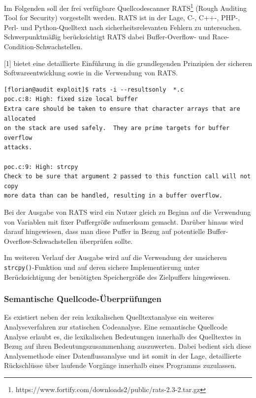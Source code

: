 Im Folgenden soll der frei verfügbare Quellcodescanner RATS\footnote{https://www.fortify.com/downloads2/public/rats-2.3-2.tar.gz} (Rough Auditing Tool for Security) vorgestellt werden. RATS ist in der Lage, C-, C++-, PHP-, Perl- und Python-Quelltext nach sicherheitsrelevanten Fehlern zu untersuchen. Schwerpunktmäßig berücksichtigt RATS dabei Buffer-Overflow- und Race-Condition-Schwachstellen.

[1] bietet eine detaillierte Einführung in die grundlegenden Prinzipien der sicheren Softwareentwicklung sowie in die Verwendung von RATS.

\begin{lstlisting}[basicstyle=\ttfamily\footnotesize]
[florian@audit exploit]$ rats -i --resultsonly  *.c
poc.c:8: High: fixed size local buffer
Extra care should be taken to ensure that character arrays that are allocated
on the stack are used safely.  They are prime targets for buffer overflow
attacks.

poc.c:9: High: strcpy
Check to be sure that argument 2 passed to this function call will not copy
more data than can be handled, resulting in a buffer overflow.
\end{lstlisting}

Bei der Ausgabe von RATS wird ein Nutzer gleich zu Beginn auf die Verwendung von Variablen mit fixer Puffergröße aufmerksam gemacht. Darüber hinaus wird darauf hingewiesen, dass man diese Puffer in Bezug auf potentielle Buffer-Overflow-Schwachstellen überprüfen sollte.

Im weiteren Verlauf der Ausgabe wird auf die Verwendung der unsicheren  \texttt{strcpy()}-Funktion und auf deren sichere Implementierung unter Berücksichtigung der benötigten Speichergröße des Zielpuffers hingewiesen.

\subsubsection{Semantische Quellcode-Überprüfungen}

Es existiert neben der rein lexikalischen Quelltextanalyse ein weiteres Analyseverfahren zur statischen Codeanalyse. Eine semantische Quellcode Analyse erlaubt es, die lexikalischen Bedeutungen innerhalb des Quelltextes in Bezug auf ihren Bedeutungszusammenhang auszuwerten. Dabei bedient sich diese Analysemethode einer Datenflussanalyse und ist somit in der Lage, detaillierte Rückschlüsse über laufende Vorgänge innerhalb eines Programms zuzulassen.


